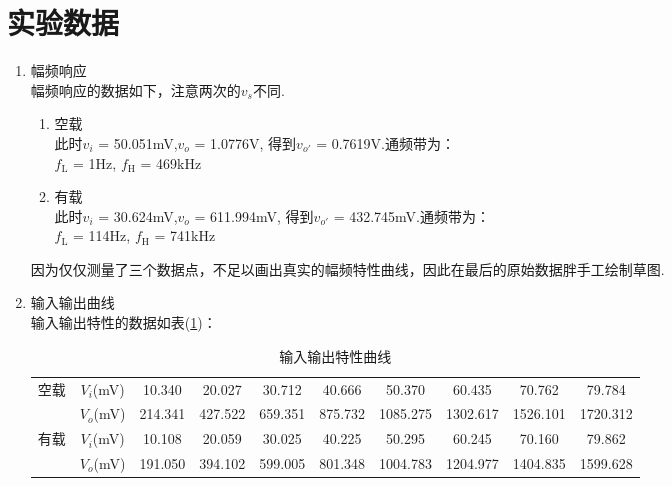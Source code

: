 \documentclass[a4paper]{article}
\begin{document}
\section{实验数据}
\begin{enumerate}
\item 幅频响应\\
幅频响应的数据如下，注意两次的$v_s$不同.
\begin{enumerate}
\item 空载\\
此时$v_i$ = 50.051mV,$v_o$ = 1.0776V, 得到$v_{o'}$ = 0.7619V.通频带为：\\
$f_\text{L}$ = 1Hz, $f_\text{H}$ = 469kHz
\item 有载\\
此时$v_i$ = 30.624mV,$v_o$ = 611.994mV, 得到$v_{o'}$ = 432.745mV.通频带为：\\
$f_\text{L}$ = 114Hz, $f_\text{H}$ = 741kHz
\end{enumerate}
因为仅仅测量了三个数据点，不足以画出真实的幅频特性曲线，因此在最后的原始数据胖手工绘制草图.
\item 输入输出曲线\\
输入输出特性的数据如表(\ref{tableIO})：
\begin{table}[!h]
\centering
\caption{输入输出特性曲线}
\label{tableIO}
\begin{tabular}{|c|c|c|c|c|c|c|c|c|c|}
\hline
\multirow{2}{*}{空载} & $V_i$(mV) & 10.340  & 20.027  & 30.712  & 40.666  & 50.370   & 60.435   & 70.762   & 79.784   \\ \cline{2-10} 
                    & $V_o$(mV) & 214.341 & 427.522 & 659.351 & 875.732 & 1085.275 & 1302.617 & 1526.101 & 1720.312 \\ \hline
\multirow{2}{*}{有载} & $V_i$(mV) & 10.108  & 20.059  & 30.025  & 40.225  & 50.295   & 60.245   & 70.160   & 79.862   \\ \cline{2-10} 
                    & $V_o$(mV) & 191.050 & 394.102 & 599.005 & 801.348 & 1004.783 & 1204.977 & 1404.835 & 1599.628 \\ \hline
\end{tabular}
\end{table}


\end{enumerate}
\end{document}
